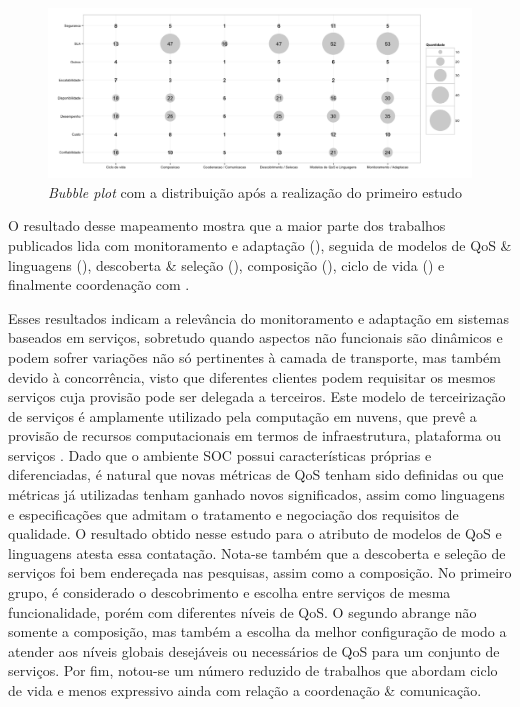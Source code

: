 \begin{figure}[htb]
\centering
\includegraphics[scale=0.4]{imagens/contribuicaoContexto.pdf}
\caption{\emph{Bubble plot} com a distribui\c{c}\~{a}o ap\'{o}s a realiza\c{c}\~{a}o do primeiro  estudo}
\label{fig:bubbleplot-QoSSOC}
\end{figure}

O resultado desse mapeamento mostra que a maior parte dos trabalhos publicados lida com monitoramento e adapta\c{c}\~{a}o (\MonitoramentoAdaptacao), seguida de modelos de QoS \& linguagens (\ModelosdeQoSeLinguagens), descoberta \& sele\c{c}\~{a}o (\DescobrimentoSelecao),  composi\c{c}\~{a}o (\Composicao), ciclo de vida (\Ciclodevida) e finalmente coordenação com \CoodenacaoComunicacao.

Esses resultados indicam a relevância do monitoramento e adaptação em sistemas baseados em serviços, sobretudo quando aspectos não funcionais são dinâmicos e podem sofrer variações não só pertinentes à camada de transporte, mas também devido à concorrência, visto que diferentes clientes podem requisitar os mesmos serviços cuja provisão pode ser delegada a terceiros. Este modelo de terceirização de serviços é amplamente utilizado pela computação em nuvens, que prevê a provisão de recursos computacionais em termos de infraestrutura, plataforma ou serviços \cite{10.1109/MIC.2010.147}. Dado que o ambiente SOC possui características próprias e diferenciadas, é natural que novas métricas de QoS tenham sido definidas ou que métricas já utilizadas tenham ganhado novos significados, assim como linguagens e especificações que admitam o tratamento e negociação dos requisitos de qualidade. O resultado obtido nesse estudo para o atributo de modelos de QoS e linguagens atesta essa contatação. Nota-se também que a descoberta e seleção de serviços foi bem endereçada nas pesquisas, assim como a composição. No primeiro grupo, é considerado o descobrimento e escolha entre serviços de mesma funcionalidade, porém com diferentes níveis de QoS. O segundo abrange não somente a composição, mas também a escolha da melhor configuração de modo a atender aos níveis globais desejáveis ou necessários de QoS para um conjunto de serviços. Por fim, notou-se um número reduzido de trabalhos que abordam ciclo de vida e menos expressivo ainda com rela\c{c}\~{a}o a coordenação \& comunicação. 